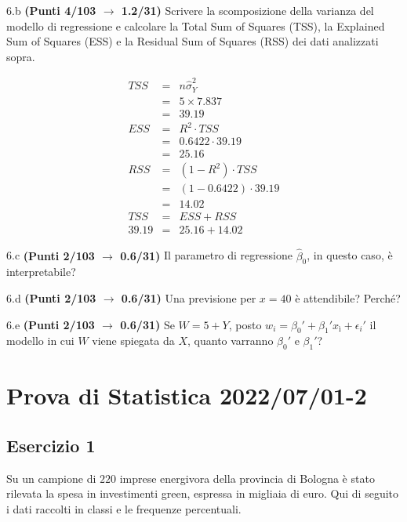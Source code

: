 \documentclass[
  11pt,
]{book}
\theoremstyle{mytheoremstyle}
\theoremstyle{mydefstyle}
\newenvironment{sol}
  {
  \begin{tcolorbox}[enhanced,breakable,arc=0.1mm,boxrule=1pt,colback=white,colframe=iblue,
  title=\bf \fontfamily{lmss}\selectfont \hspace{.5 cm} Soluzione,drop fuzzy shadow]

}{
\end{tcolorbox}
  }
\begin{document}
6.b \textbf{(Punti 4/103 \(\rightarrow\) 1.2/31)} Scrivere la scomposizione della varianza del modello di regressione
e calcolare la Total Sum of Squares (TSS), la Explained Sum of Squares (ESS) e la Residual Sum of Squares (RSS) dei dati analizzati sopra.

\begin{sol}
\begin{eqnarray*}
   TSS &=& n\hat\sigma^2_Y\\
      &=& 5 \times 7.837 \\
      &=&  39.19 \\
   ESS &=& R^2\cdot TSS\\
      &=&  0.6422 \cdot 39.19 \\
      &=& 25.16 \\
   RSS &=& (1-R^2)\cdot TSS\\
      &=& (1- 0.6422 )\cdot 39.19 \\
      &=&  14.02 \\
   TSS &=& ESS+RSS \\ 39.19  &=&  25.16 + 14.02 
  \end{eqnarray*}

\end{sol}

6.c \textbf{(Punti 2/103 \(\rightarrow\) 0.6/31)} Il parametro di regressione \(\hat\beta_0\), in questo caso, è interpretabile?

6.d \textbf{(Punti 2/103 \(\rightarrow\) 0.6/31)} Una previsione per \(x=40\) è attendibile? Perché?

6.e \textbf{(Punti 2/103 \(\rightarrow\) 0.6/31)} Se \(W=5+ Y\), posto \(w_i=\beta_0'+\beta_1'x_ì +\epsilon_i'\)
il modello in cui \(W\) viene spiegata da \(X\), quanto varranno \(\beta_0'\) e \(\beta_1'\)?

\section{Prova di Statistica 2022/07/01-2}\label{prova-di-statistica-20220701-2}

\subsection{Esercizio 1}\label{esercizio-1-14}

Su un campione di \(220\) imprese energivora della provincia di Bologna è stato
rilevata la spesa in investimenti green, espressa in migliaia di euro. Qui di seguito i dati raccolti in classi
e le frequenze percentuali.
\end{document}

